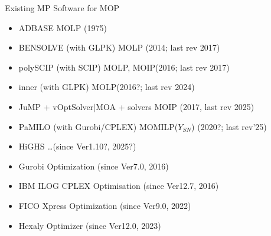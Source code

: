 \documentclass[]{beamer}
\begin{document}
\begin{frame}{Existing MP Software for MOP}

\begin{itemize}

\item ADBASE \hspace{27mm}MOLP \hfill (1975)\\
\pause
\item BENSOLVE (with GLPK) \hspace{3mm}MOLP \hfill (2014; last rev 2017)\\

\item polySCIP (with SCIP) \hspace{7mm} MOLP, MOIP\hfill (2016; last rev 2017)\\

\item inner (with GLPK) \hspace{12.5mm} MOLP\hfill (2016?; last rev 2024)\\

\item JuMP + vOptSolver$\mid$MOA + solvers \hspace{1mm} MOIP \hfill (2017, last rev 2025)\\

\item PaMILO (with Gurobi/CPLEX)  \hspace{0mm} MOMILP($Y_{SN}$) \hfill (2020?; last rev'25)\\
\pause

\item HiGHS \hspace{29.25mm} \dots  \hfill (since Ver1.10?, 2025?)\\

\end{itemize}


\vspace{3mm}


\vspace{3mm}

\begin{itemize}
\item Gurobi Optimization \hfill (since Ver7.0, 2016)\\

\item IBM ILOG CPLEX Optimisation \hfill (since Ver12.7, 2016)\\

\item FICO Xpress Optimization \hfill (since Ver9.0, 2022)\\

\item Hexaly Optimizer \hfill (since Ver12.0, 2023)\\

\end{itemize}

\end{frame}
\end{document}
